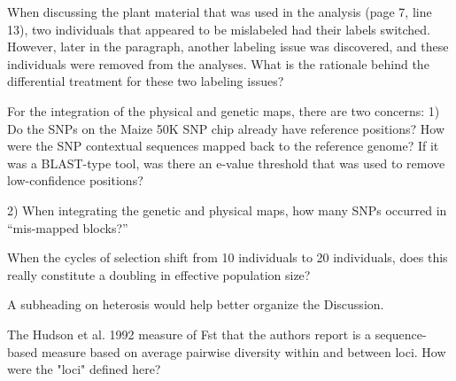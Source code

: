 \documentclass[onecolumn,oneside,letterpaper]{article}
\begin{document}
When discussing the plant material that was used in the analysis (page 7, line 13), two individuals that 
appeared to be mislabeled had their labels switched. However, later in the paragraph, another labeling 
issue was discovered, and these individuals were removed from the analyses. What is the rationale behind 
the differential treatment for these two labeling issues?


For the integration of the physical and genetic maps, there are two concerns:
1) Do the SNPs on the Maize 50K SNP chip already have reference positions? How were the SNP contextual 
sequences mapped back to the reference genome? If it was a BLAST-type tool, was there an e-value 
threshold that was used to remove low-confidence positions? 


2) When integrating the genetic and physical maps, how many SNPs occurred in “mis-mapped blocks?” 


When the cycles of selection shift from 10 individuals to 20 individuals, does this really constitute a 
doubling in effective population size?


A subheading on heterosis would help better organize the Discussion.


The Hudson et al. 1992 measure of Fst that the authors report is a sequence-based measure based on 
average pairwise diversity within and between loci. How were the "loci" defined here?
\end{document}
